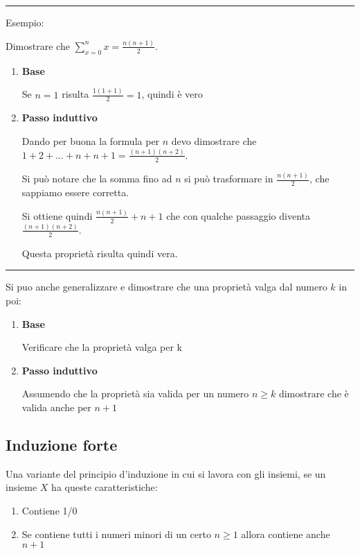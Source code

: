 \documentclass{article}
\begin{document}
\noindent\rule{\textwidth}{0.5pt}

\noindent Esempio:\newline

\noindent Dimostrare che $\sum_{x=0}^nx=\frac{n(n+1)}{2}$.
\begin{enumerate}
    \item \textbf{Base} 
    
    Se $n=1$ risulta $\frac{1(1+1)}{2}=1$, quindi è vero
    \item \textbf{Passo induttivo}

    Dando per buona la formula per $n$ devo dimostrare che $1+2+\ldots+n+n+1=\frac{(n+1)(n+2)}{2}$.\newline

    Si può notare che la somma fino ad $n$ si può trasformare in $\frac{n(n+1)}{2}$, che sappiamo essere corretta.\newline

    Si ottiene quindi $\frac{n(n+1)}{2}+n+1$ che con qualche passaggio diventa $\frac{(n+1)(n+2)}{2}$.\newline

    Questa proprietà risulta quindi vera.
    
\end{enumerate}

\noindent\rule{\textwidth}{0.5pt}\newline

\noindent Si puo anche generalizzare  e dimostrare che una proprietà valga dal numero $k$ in poi:
\begin{enumerate}
    \item \textbf{Base} 
    
    Verificare che la proprietà valga per k
    \item \textbf{Passo induttivo} 
    
    Assumendo che la proprietà sia valida per un numero $n\geq k$ dimostrare che è valida anche per $n+1$
\end{enumerate}

\subsection{Induzione forte}

Una variante del principio d'induzione in cui si lavora con gli insiemi, se un insieme $X$ ha queste caratteristiche:
\begin{enumerate}
    \item Contiene 1/0
    \item Se contiene tutti i numeri minori di un certo $n\geq 1$ allora contiene anche $n+1$\newline
\end{enumerate}
\end{document}
